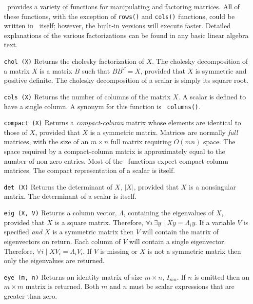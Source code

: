 \burlap\ provides a variety of functions for manipulating and
factoring matrices.  All of these functions, with the exception of
{\tt rows()} and {\tt cols()} functions, could be written in \burlap\
itself; however, the built-in versions will execute faster.  Detailed
explanations of the various factorizations can be found in any basic
linear algebra text.

\begin{dispitems}
\item[\tt chol (X)]
Returns the cholesky factorization of $X$.  The cholesky decomposition
of a matrix $X$ is a matrix $B$ such that $BB^T=X$, provided that $X$
is symmetric and positive definite.  The cholesky decomposition of a
scalar is simply its square root.

\item[\tt cols (X)]
Returns the number of columns of the matrix $X$.  A scalar is defined
to have a single column.  A synonym for this function is {\tt
columns()}.

\item[\tt compact (X)]
Returns a {\em compact-column} matrix whose elements are identical to
those of $X$, provided that $X$ is a symmetric matrix.  Matrices are
normally {\em full} matrices, with the size of an $m \times n$ full
matrix requiring $O(mn)$ space.  The space required by a
compact-column matrix is approximately equal to the number of non-zero
entries.  Most of the \felt\ functions expect compact-column matrices.
The compact representation of a scalar is itself.

\item[\tt det (X)]
Returns the determinant of $X$, $|X|$, provided that $X$
is a nonsingular matrix.  The determinant of a scalar is itself.

\item[\tt eig (X, V)]
Returns a column vector, $\Lambda$, containing the eigenvalues of $X$,
provided that $X$ is a square matrix. Therefore, $\forall i\ \exists y
\mid Xy=\Lambda_{i}y$.  If a variable $V$ is specified {\em and} $X$
is a symmetric matrix then $V$ will contain the matrix of eigenvectors
on return.  Each column of $V$ will contain a single eigenvector.
Therefore, $\forall i \mid XV_i=\Lambda_{i}V_i$.  If $V$ is missing or
$X$ is not a symmetric matrix then only the eigenvalues are returned.

\item[\tt eye (m, n)]
Returns an identity matrix of size $m \times n$, $I_{mn}$.  If $n$ is
omitted then an $m \times m$ matrix is returned.  Both $m$ and $n$ must
be scalar expressions that are greater than zero.


\end{dispitems}
